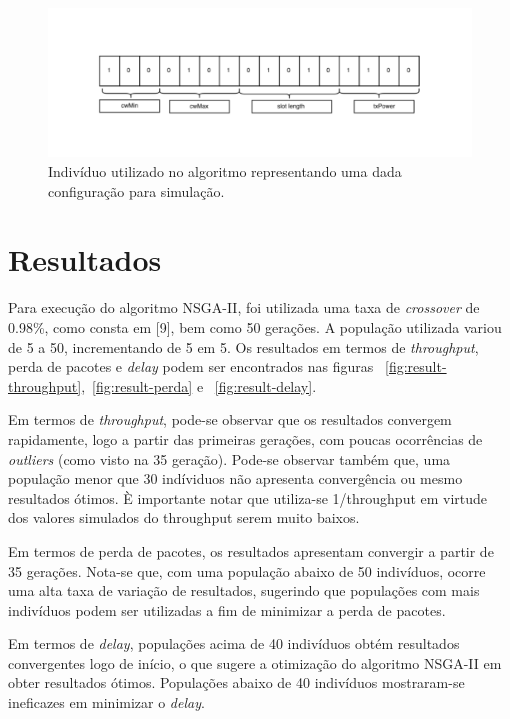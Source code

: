 \documentclass[conference]{IEEEtran}
\begin{document}
\begin{figure}[h]
  \centering
  \includegraphics[scale=0.40]{figures/bits-config.pdf}
  \caption{Indivíduo utilizado no algoritmo representando uma dada configuração para simulação.}
  \label{fig:bits-config}
\end{figure}


\section{Resultados}

Para execução do algoritmo NSGA-II, foi utilizada uma taxa de \textit{crossover} de 0.98\%, como consta em [9], bem como 50 gerações.
A população utilizada variou de 5 a 50, incrementando de 5 em 5. Os resultados em termos de \textit{throughput}, perda de pacotes e \textit{delay}
podem ser encontrados nas figuras ~\ref{fig:result-throughput},~\ref{fig:result-perda} e ~\ref{fig:result-delay}.

Em termos de \textit{throughput}, pode-se observar que os resultados convergem rapidamente, logo a partir das primeiras gerações, com poucas ocorrências de \textit{outliers} (como visto na 35 geração).
Pode-se observar também que, uma população menor que 30 indíviduos não apresenta convergência ou mesmo resultados ótimos.
È importante notar que utiliza-se 1/throughput em virtude dos valores simulados do throughput serem muito baixos.

Em termos de perda de pacotes, os resultados apresentam convergir a partir de 35 gerações. Nota-se que, com uma população abaixo de 50 indivíduos, ocorre uma alta taxa de variação de resultados,
sugerindo que populações com mais indivíduos podem ser utilizadas a fim de minimizar a perda de pacotes.

Em termos de \textit{delay}, populações acima de 40 indivíduos obtém resultados convergentes logo de início, o que sugere a otimização do algoritmo NSGA-II em obter resultados ótimos.
Populações abaixo de 40 indivíduos mostraram-se ineficazes em minimizar o \textit{delay}.
\end{document}
